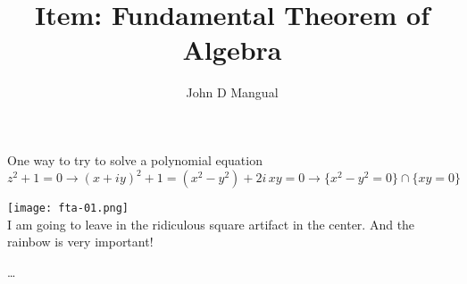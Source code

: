 \documentclass[12pt]{article}
\title{Item: \textbf{Fundamental Theorem of Algebra}}
\author{John D Mangual}
\date{}
\begin{document}
\selectfont \fontsize{12.5}{15}\selectfont

\maketitle

\noindent One way to try to solve a polynomial equation
$$ z^2 + 1 = 0 \to (x + iy)^2 + 1 = (x^2 - y^2) + 2i\, xy = 0  \to \{ x^2 - y^2 = 0\}\cap \{xy=0\}$$

\texttt{[image: fta-01.png]} \\
I am going to leave in the ridiculous square artifact in the center.  And the rainbow is very important!

\vfill 


\selectfont \fontsize{12}{10}\selectfont

\begin{thebibliography}{}

\item \dots

\end{thebibliography} 
\end{document}
